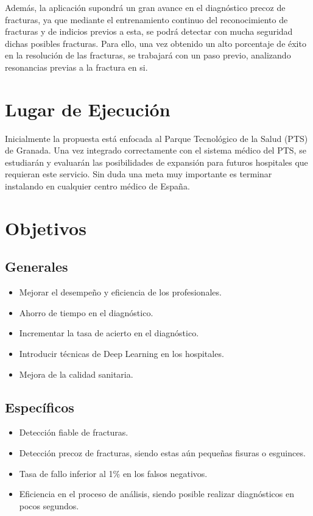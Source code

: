 Además, la aplicación supondrá un gran avance en el diagnóstico precoz de fracturas, ya que mediante el entrenamiento continuo del reconocimiento de fracturas y de indicios previos a esta, se podrá detectar con mucha seguridad dichas posibles fracturas. Para ello, una vez obtenido un alto porcentaje de éxito en la resolución de las fracturas, se trabajará con un paso previo, analizando resonancias previas a la fractura en si. 

\section{Lugar de Ejecución}

Inicialmente la propuesta está enfocada al Parque Tecnológico de la Salud (PTS) de Granada. Una vez integrado correctamente con el sistema médico del PTS, se estudiarán y evaluarán las posibilidades de expansión para futuros hospitales que requieran este servicio. Sin duda una meta muy importante es terminar instalando en cualquier centro médico de España.

\section{Objetivos}
\subsection{Generales} 
\begin{itemize}
	\item Mejorar el desempeño y eficiencia de los profesionales.
	\item Ahorro de tiempo en el diagnóstico.
	\item Incrementar la tasa de acierto en el diagnóstico.
	\item Introducir técnicas de Deep Learning en los hospitales.
	\item Mejora de la calidad sanitaria.
\end{itemize}

\subsection{Específicos}
\begin{itemize}
	\item Detección fiable de fracturas.
	\item Detección precoz de fracturas, siendo estas aún pequeñas fisuras o esguinces.
	\item Tasa de fallo inferior al 1\% en los falsos negativos.
	\item Eficiencia en el proceso de análisis, siendo posible realizar diagnósticos en pocos segundos.
\end{itemize}

